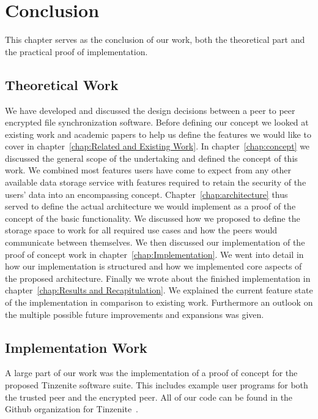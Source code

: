 \chapter{Conclusion}
\label{chap:conclusion}

This chapter serves as the conclusion of our work, both the theoretical part and the practical proof of implementation.

\section{Theoretical Work}
\label{sec:Theoretical Work}

We have developed and discussed the design decisions between a peer to peer encrypted file synchronization software.
Before defining our concept we looked at existing work and academic papers to help us define the features we would like to cover in chapter~\ref{chap:Related and Existing Work}.
In chapter~\ref{chap:concept} we discussed the general scope of the undertaking and defined the concept of this work.
We combined most features users have come to expect from any other available data storage service with features required to retain the security of the users' data into an encompassing concept.
Chapter~\ref{chap:architecture} thus served to define the actual architecture we would implement as a proof of the concept of the basic functionality.
We discussed how we proposed to define the storage space to work for all required use cases and how the peers would communicate between themselves.
We then discussed our implementation of the proof of concept work in chapter~\ref{chap:Implementation}.
We went into detail in how our implementation is structured and how we implemented core aspects of the proposed architecture.
Finally we wrote about the finished implementation in chapter~\ref{chap:Results and Recapitulation}.
We explained the current feature state of the implementation in comparison to existing work.
Furthermore an outlook on the multiple possible future improvements and expansions was given.

\section{Implementation Work}
\label{sec:Implementation Work}

A large part of our work was the implementation of a proof of concept for the proposed Tinzenite software suite.
This includes example user programs for both the trusted peer and the encrypted peer.
All of our code can be found in the Github organization for Tinzenite~\cite{web:site:github:tinzenite}.

